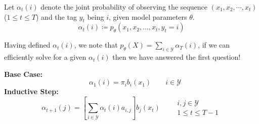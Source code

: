 \documentclass[envcountsect]{beamer}
\newcommand{\boldX}{X}
\newcommand{\ptheta}{p_\theta}
\begin{document}
\begin{frame}

    \begin{definition}
        Let $\alpha_t(i)$ denote the joint probability of observing the sequence $(x_1, x_2, \cdots, x_t)$ ($1 \leq t \leq T$) and the tag $y_t$ being $i$, given model parameters $\theta$.
        \begin{equation*}
            \alpha_t(i) \coloneqq \ptheta(x_1,x_2,\ldots,x_t,y_t=i)
        \end{equation*}
    \end{definition}

\pause

Having defined $\alpha_t(i)$, we note that $\ptheta(\boldX) = \sum_{i \in \mathcal{Y}} \alpha_T(i)$, if we can efficiently solve for a given $\alpha_t(i)$ then we have answered the first question!

\pause
\vspace{0.5cm}
\centering \textbf{Base Case:}
\begin{equation*}
        \quad \alpha_1(i) = \pi_{i} b_i(x_1) \qquad i \in \mathcal{Y}
\end{equation*}
\pause
\textbf{Inductive Step:}
\begin{equation*}
        \alpha_{t+1}(j) = \left[ \sum_{i \in \mathcal{Y}} \alpha_{t}(i)a_{i,j} \right] b_j(x_t) \qquad 
        \begin{array}{lr}
            i,j \in \mathcal{Y} \\
            1 \leq t \leq T-1
        \end{array}
\end{equation*}

\end{frame}
\end{document}
